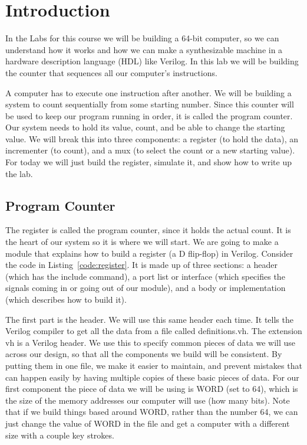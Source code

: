 \chapter{Introduction}

In the Labs for this course we will be building a 64-bit computer, so we can understand how it works and how we can make a synthesizable machine in a hardware description language (HDL) like Verilog.  In this lab we will be building the counter that sequences all our computer's instructions.

A computer has to execute one instruction after another.  We will be building a system to count sequentially from some starting number.  Since this counter will be used to keep our program running in order, it is called the program counter.  Our system needs to hold its value, count, and be able to change the starting value.  We will break this into three components: a register (to hold the data), an incrementer (to count), and a mux (to select the count or a new starting value).  For today we will just build the register, simulate it, and show how to write up the lab.

\section{Program Counter}

The register is called the program counter, since it holds the actual count.  It is the heart of our system so it is where we will start.  We are going to make a module that explains how to build a register (a D flip-flop) in Verilog.  Consider the code in Listing~\ref{code:register}.  It is made up of three sections: a header (which has the include command), a port list or interface (which specifies the signals coming in or going out of our module), and a body or implementation (which describes how to build it).


The first part is the header.  We will use this same header each time.  It tells the Verilog compiler to get all the data from a file called definitions.vh.  The extension vh is a Verilog header.  We use this to specify common pieces of data we will use across our design, so that all the components we build will be consistent.  By putting them in one file, we make it easier to maintain, and prevent mistakes that can happen easily by having multiple copies of these basic pieces of data.  For our first component the piece of data we will be using is WORD (set to 64), which is the size of the memory addresses our computer will use (how many bits).  Note that if we build things based around WORD, rather than the number 64, we can just change the value of WORD in the file and get a computer with a different size with a couple key strokes.

